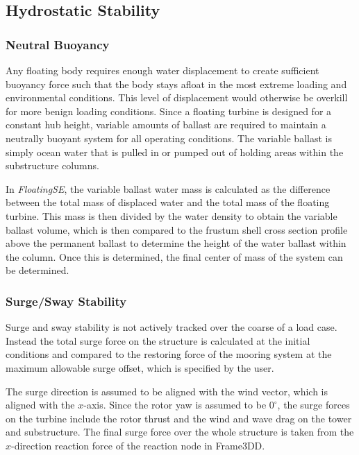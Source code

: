 \subsection{Hydrostatic Stability}
\label{sec:static}
\subsubsection{Neutral Buoyancy}
Any floating body requires enough water displacement to create
sufficient buoyancy force such that the body stays afloat in the most
extreme loading and environmental conditions.  This level of
displacement would otherwise be overkill for more benign loading
conditions.  Since a floating turbine is designed for a constant hub
height, variable amounts of ballast are required to maintain a neutrally
buoyant system for all operating conditions.  The variable ballast is
simply ocean water that is pulled in or pumped out of holding areas
within the substructure columns.

In \textit{FloatingSE}, the variable ballast water mass is calculated as
the difference between the total mass of displaced water and the total
mass of the floating turbine.  This mass is then divided by the water
density to obtain the variable ballast volume, which is then compared to
the frustum shell cross section profile above the permanent ballast to
determine the height of the water ballast within the column.  Once this
is determined, the final center of mass of the system can be determined.

\subsubsection{Surge/Sway Stability}
Surge and sway stability is not actively tracked over the coarse of a
load case.  Instead the total surge force on the structure is calculated
at the initial conditions and compared to the restoring force of the
mooring system at the maximum allowable surge offset, which is specified
by the user.

The surge direction is assumed to be aligned with the wind vector, which
is aligned with the $x$-axis.  Since the rotor yaw is assumed to be
$0^{\circ}$, the surge forces on the turbine include the rotor thrust
and the wind and wave drag on the tower and substructure.  The final
surge force over the whole structure is taken from the $x$-direction
reaction force of the reaction node in Frame3DD.

